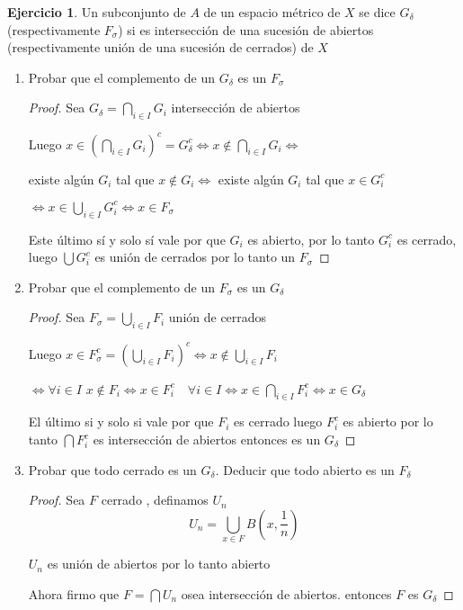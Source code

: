 \documentclass[12pt]{report}
\theoremstyle{definition}
\newtheorem{ej}{Ejercicio}
\begin{document}
\begin{ej}
Un subconjunto de $A$ de un espacio métrico de $X$ se dice $G_{\delta}$ (respectivamente $F_\sigma$) si es intersección de una sucesión de abiertos (respectivamente unión de una sucesión de cerrados) de $X$
\begin{enumerate}
  \item Probar que el complemento de un $ G_{\delta}$ es un $F_{\sigma}$
    \begin{proof}
    Sea $G_{\delta} = \bigcap_{i \in I} G_i$ intersección de abiertos

    Luego $x \in (\bigcap_{i \in I} G_i)^c = G_{\delta}^c \iff x \notin \bigcap_{i \in I}G_i \iff$

    existe algún $G_i$ tal que $x \notin G_i \iff$ existe algún $G_i$ tal que $ x \in G_{i}^c$

    $\iff x \in \bigcup_{i \in I} G_i^c \iff x \in F_{\sigma}$
 
    Este último sí y solo sí vale por que $G_i$ es abierto, por lo tanto $G_{i}^c$ es cerrado, luego $\bigcup G_i^c$ es unión de cerrados por lo tanto un $F_{\sigma}$
    \end{proof}
    \newpage
  \item Probar que el complemento de un $F_{\sigma}$ es un $G_{\delta}$
    \begin{proof}
      Sea $F_{\sigma} = \bigcup_{i \in I}F_i$ unión de cerrados 
      
      Luego $x \in F_{\sigma}^c = (\bigcup_{i \in I} F_i)^c \iff x \notin \bigcup_{i \in I} F_i$ 

      $\iff \forall i \in I$ $x \notin F_i \iff x \in F_i^c \quad \forall i \in I \iff x \in \bigcap_{i \in I} F_i^c \iff x \in G_{\delta}$  

      El último si y solo si vale por que  $F_i$ es cerrado luego $F_i^c$ es abierto por lo tanto $\bigcap F_{i}^c$ es intersección de abiertos entonces es un $G_{\delta}$

    \end{proof}
  \item Probar que todo cerrado es un $G_{\delta}$. Deducir que todo abierto es un $F_{\delta}$
\begin{proof}
  Sea $F$ cerrado , definamos $U_n$ $$U_n = \bigcup_{x \in F} B(x,\frac{1}{n})$$

  $U_n$ es unión de abiertos por lo tanto abierto

  Ahora firmo que $F = \bigcap U_n$ osea intersección de abiertos. entonces $F$ es $G_{\delta}$


\end{proof}
\end{enumerate}
\end{ej}
\end{document}
